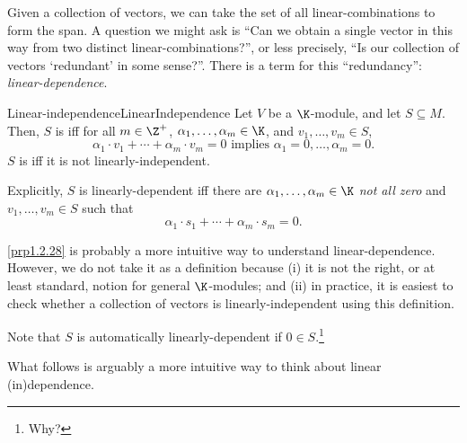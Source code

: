 Given a collection of vectors, we can take the set of all linear-combinations to form the span.  A question we might ask is ``Can we obtain a single vector in this way from two distinct linear-combinations?'', or less precisely, ``Is our collection of vectors `redundant' in some sense?''.  There is a term for this ``redundancy'':  \emph{linear-dependence}.
\begin{dfn}{Linear-independence}{LinearIndependence}
	Let $V$ be a $\K$-module, and let $S\subseteq M$.  Then, $S$ is  iff for all $m\in \Z ^+$, $\alpha _1,\ldots ,\alpha _m\in \K$, and $v_1,\ldots ,v_m\in S$,
	\begin{equation}
	\alpha _1\cdot v_1+\cdots +\alpha _m\cdot v_m=0\text{ implies }\alpha _1=0,\ldots ,\alpha _m=0.
	\end{equation}
	$S$ is  iff it is not linearly-independent.
	\begin{rmk}
		Explicitly, $S$ is linearly-dependent iff there are $\alpha _1,\ldots ,\alpha _m\in \K$ \emph{not all zero} and $v_1,\ldots ,v_m\in S$ such that
		\begin{equation}
			\alpha _1\cdot s_1+\cdots +\alpha _m\cdot s_m=0.
		\end{equation}
	\end{rmk}
	\begin{rmk}
		\cref{prp1.2.28} is probably a more intuitive way to understand linear-dependence.  However, we do not take it as a definition because (i) it is not the right, or at least standard, notion for general $\K$-modules; and (ii) in practice, it is easiest to check whether a collection of vectors is linearly-independent using this definition.
	\end{rmk}
	\begin{rmk}
		Note that $S$ is automatically linearly-dependent if $0\in S$.\footnote{Why?}
	\end{rmk}
\end{dfn}
What follows is arguably a more intuitive way to think about linear (in)dependence.
